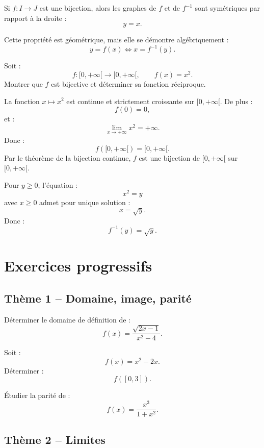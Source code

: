 \documentclass[11pt,a4paper]{article}
\newcommand{\ssi}{\Longleftrightarrow}
\begin{document}
Si \(f:I\to J\) est une bijection, alors les graphes de \(f\) et de \(f^{-1}\) sont symétriques par rapport à la droite :
\[
y=x.
\]

Cette propriété est géométrique, mais elle se démontre algébriquement :
\[
y=f(x)
\ssi
x=f^{-1}(y).
\]

\begin{exercicebox}[Réciproque]
Soit :
\[
f:[0,+\infty[\to[0,+\infty[,
\qquad
f(x)=x^2.
\]
Montrer que \(f\) est bijective et déterminer sa fonction réciproque.
\end{exercicebox}

\begin{correctionbox}
La fonction \(x\mapsto x^2\) est continue et strictement croissante sur \([0,+\infty[\).  
De plus :
\[
f(0)=0,
\]
et :
\[
\lim_{x\to+\infty}x^2=+\infty.
\]
Donc :
\[
f([0,+\infty[)=[0,+\infty[.
\]
Par le théorème de la bijection continue, \(f\) est une bijection de \([0,+\infty[\) sur \([0,+\infty[\).

Pour \(y\geq0\), l'équation :
\[
x^2=y
\]
avec \(x\geq0\) admet pour unique solution :
\[
x=\sqrt y.
\]
Donc :
\[
f^{-1}(y)=\sqrt y.
\]
\end{correctionbox}

\newpage
\section{Exercices progressifs}

\subsection*{Thème 1 -- Domaine, image, parité}

\begin{exercicebox}[1]
Déterminer le domaine de définition de :
\[
f(x)=\frac{\sqrt{2x-1}}{x^2-4}.
\]
\end{exercicebox}

\begin{exercicebox}[2]
Soit :
\[
f(x)=x^2-2x.
\]
Déterminer :
\[
f([0,3]).
\]
\end{exercicebox}

\begin{exercicebox}[3]
Étudier la parité de :
\[
f(x)=\frac{x^3}{1+x^2}.
\]
\end{exercicebox}

\subsection*{Thème 2 -- Limites}
\end{document}
